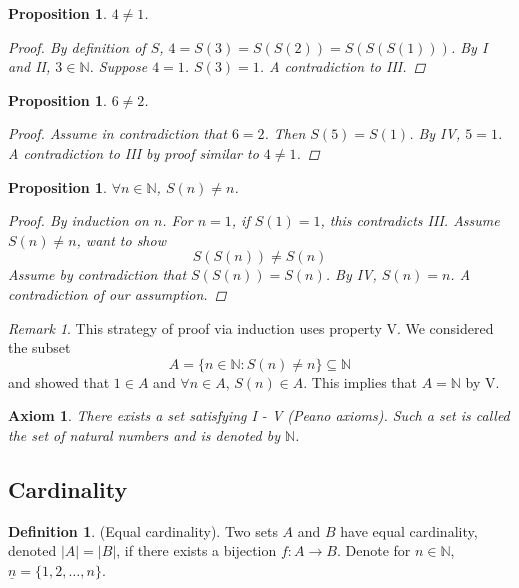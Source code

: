\documentclass[10pt]{article}
\newcommand{\N}{\mathbb{N}}
\newcommand{\abs}[1]{\left| #1 \right|}
\newtheorem{proposition}[theorem]{Proposition}
\newtheorem{axiom}[theorem]{Axiom}
\theoremstyle{definition}
\newtheorem{definition}[theorem]{Definition}
\theoremstyle{remark}
\newtheorem*{remark}{Remark}
\begin{document}
\begin{proposition}
    $4 \neq 1$.
    \begin{proof}
        By definition of $S$, $4 = S(3) = S(S(2)) = S(S(S(1)))$. By I and II, $3 \in \N$.
        Suppose $4 = 1$. $S(3) = 1$. A contradiction to III.
    \end{proof}
\end{proposition}

\begin{proposition}
    $6 \neq 2$.
    \begin{proof}
        Assume in contradiction that $6 = 2$. Then $S(5) = S(1)$. By IV, $5 = 1$. A contradiction to III by proof similar to $4 \neq 1$.
    \end{proof}
\end{proposition}

\begin{proposition}
    $\forall n \in \N$, $S(n) \neq n$.
    \begin{proof}
        By induction on $n$. For $n = 1$, if $S(1) = 1$, this contradicts III. Assume $S(n) \neq n$, want to show
        $$S(S(n)) \neq S(n)$$
        Assume by contradiction that $S(S(n)) = S(n)$. By IV, $S(n) = n$. A contradiction of our assumption.
    \end{proof}
\end{proposition}
\begin{remark}
    This strategy of proof via induction uses property V. We considered the subset
    $$A = \{n \in \N \colon S(n) \neq n\} \subseteq \N$$
    and showed that $1 \in A$ and $\forall n \in A$, $S(n) \in A$. This implies that $A = \N$ by V.
\end{remark}

\begin{axiom}
    There exists a set satisfying I - V (Peano axioms). Such a set is called the set of natural numbers and is denoted by $\N$.
\end{axiom}

\subsection{Cardinality}

\begin{definition}
    (Equal cardinality).
    Two sets $A$ and $B$ have equal cardinality, denoted $\abs{A} = \abs{B}$, if there exists a bijection $f: A \to B$.
    Denote for $n \in \N$, $\underline{n} = \{1, 2, \ldots, n\}$.
\end{definition}
\end{document}
